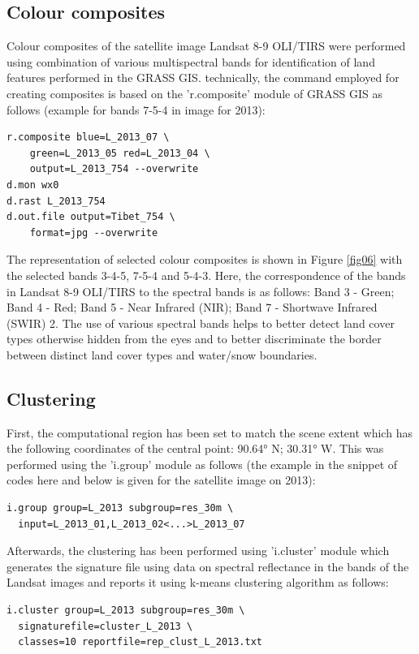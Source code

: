 \documentclass[final,5p,times,twocolumn]{elsarticle}
\begin{document}
\subsection{Colour composites}
Colour composites of the satellite image Landsat 8-9 OLI/TIRS were performed using combination of various multispectral bands for identification of land features performed in the GRASS GIS. technically, the command employed for creating composites is based on the 'r.composite' module of GRASS GIS as follows (example for bands 7-5-4 in image for 2013):

\begin{verbatim}
r.composite blue=L_2013_07 \
	green=L_2013_05 red=L_2013_04 \
	output=L_2013_754 --overwrite
d.mon wx0
d.rast L_2013_754
d.out.file output=Tibet_754 \
	format=jpg --overwrite
\end{verbatim}

The representation of selected colour composites is shown in Figure \ref{fig06} with the selected bands 3-4-5, 7-5-4  and 5-4-3. Here, the correspondence of the bands in Landsat 8-9 OLI/TIRS to the spectral bands is as follows: Band 3 - Green; Band 4 - Red; Band 5 - Near Infrared (NIR); Band 7 - Shortwave Infrared (SWIR) 2. The use of various spectral bands helps to better detect land cover types otherwise hidden from the eyes and to better discriminate the border between distinct land cover types and water/snow boundaries. 

\subsection{Clustering}

First, the computational region has been set to match the scene extent which has the following coordinates of the central point: 90.64° N; 30.31° W. This was performed using the 'i.group' module as follows (the example in the snippet of codes here and below is given for the satellite image on 2013):
 
\begin{verbatim}
i.group group=L_2013 subgroup=res_30m \
  input=L_2013_01,L_2013_02<...>L_2013_07
\end{verbatim}

Afterwards, the clustering has been performed using 'i.cluster' module which generates the signature file using data on spectral reflectance in the bands of the Landsat images and reports it using k-means clustering algorithm as follows: 
\begin{verbatim}
i.cluster group=L_2013 subgroup=res_30m \
  signaturefile=cluster_L_2013 \
  classes=10 reportfile=rep_clust_L_2013.txt
 \end{verbatim}
 
\end{document}
